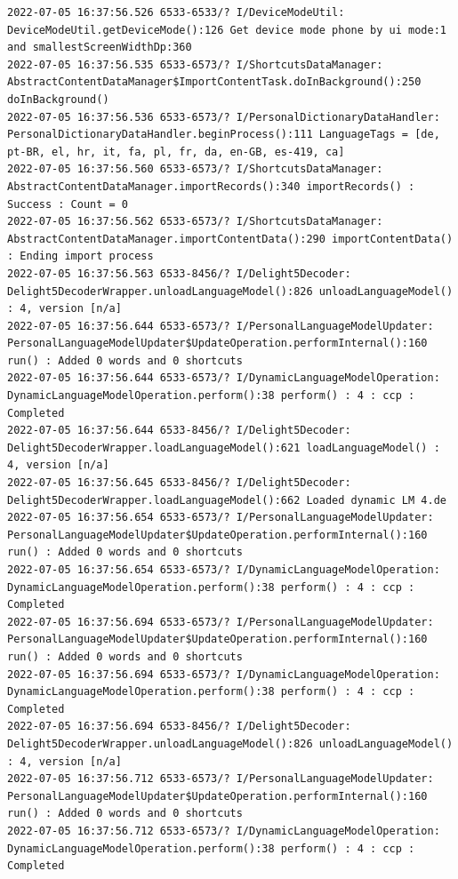 \documentclass[a4paper,12pt]{book}
\begin{document}
\begin{lstlisting}
2022-07-05 16:37:56.526 6533-6533/? I/DeviceModeUtil: DeviceModeUtil.getDeviceMode():126 Get device mode phone by ui mode:1 and smallestScreenWidthDp:360
2022-07-05 16:37:56.535 6533-6573/? I/ShortcutsDataManager: AbstractContentDataManager$ImportContentTask.doInBackground():250 doInBackground()
2022-07-05 16:37:56.536 6533-6573/? I/PersonalDictionaryDataHandler: PersonalDictionaryDataHandler.beginProcess():111 LanguageTags = [de, pt-BR, el, hr, it, fa, pl, fr, da, en-GB, es-419, ca]
2022-07-05 16:37:56.560 6533-6573/? I/ShortcutsDataManager: AbstractContentDataManager.importRecords():340 importRecords() : Success : Count = 0
2022-07-05 16:37:56.562 6533-6573/? I/ShortcutsDataManager: AbstractContentDataManager.importContentData():290 importContentData() : Ending import process
2022-07-05 16:37:56.563 6533-8456/? I/Delight5Decoder: Delight5DecoderWrapper.unloadLanguageModel():826 unloadLanguageModel() : 4, version [n/a]
2022-07-05 16:37:56.644 6533-6573/? I/PersonalLanguageModelUpdater: PersonalLanguageModelUpdater$UpdateOperation.performInternal():160 run() : Added 0 words and 0 shortcuts
2022-07-05 16:37:56.644 6533-6573/? I/DynamicLanguageModelOperation: DynamicLanguageModelOperation.perform():38 perform() : 4 : ccp : Completed
2022-07-05 16:37:56.644 6533-8456/? I/Delight5Decoder: Delight5DecoderWrapper.loadLanguageModel():621 loadLanguageModel() : 4, version [n/a]
2022-07-05 16:37:56.645 6533-8456/? I/Delight5Decoder: Delight5DecoderWrapper.loadLanguageModel():662 Loaded dynamic LM 4.de
2022-07-05 16:37:56.654 6533-6573/? I/PersonalLanguageModelUpdater: PersonalLanguageModelUpdater$UpdateOperation.performInternal():160 run() : Added 0 words and 0 shortcuts
2022-07-05 16:37:56.654 6533-6573/? I/DynamicLanguageModelOperation: DynamicLanguageModelOperation.perform():38 perform() : 4 : ccp : Completed
2022-07-05 16:37:56.694 6533-6573/? I/PersonalLanguageModelUpdater: PersonalLanguageModelUpdater$UpdateOperation.performInternal():160 run() : Added 0 words and 0 shortcuts
2022-07-05 16:37:56.694 6533-6573/? I/DynamicLanguageModelOperation: DynamicLanguageModelOperation.perform():38 perform() : 4 : ccp : Completed
2022-07-05 16:37:56.694 6533-8456/? I/Delight5Decoder: Delight5DecoderWrapper.unloadLanguageModel():826 unloadLanguageModel() : 4, version [n/a]
2022-07-05 16:37:56.712 6533-6573/? I/PersonalLanguageModelUpdater: PersonalLanguageModelUpdater$UpdateOperation.performInternal():160 run() : Added 0 words and 0 shortcuts
2022-07-05 16:37:56.712 6533-6573/? I/DynamicLanguageModelOperation: DynamicLanguageModelOperation.perform():38 perform() : 4 : ccp : Completed

\end{lstlisting}
\end{document}
